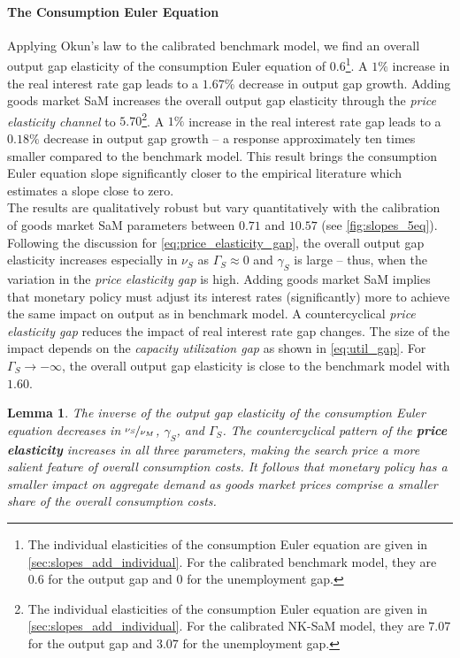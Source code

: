 \documentclass[12pt,3p,authoryear,review]{elsarticle}
\newtheorem{lemma}{Lemma}
\begin{document}
\paragraph{The Consumption Euler Equation}%
Applying Okun's law to the calibrated benchmark model, we find an overall output gap elasticity of the consumption Euler equation of $0.6$\footnote{The individual elasticities of the consumption Euler equation are given in \ref{sec:slopes_add_individual}. For the calibrated benchmark model, they are $0.6$ for the output gap and $0$ for the unemployment gap.}. A $1\%$ increase in the real interest rate gap leads to a $1.67\%$ decrease in output gap growth. Adding goods market SaM increases the overall output gap elasticity through the \emph{price elasticity channel} to $5.70$\footnote{The individual elasticities of the consumption Euler equation are given in \ref{sec:slopes_add_individual}. For the calibrated NK-SaM model, they are $7.07$ for the output gap and $3.07$ for the unemployment gap.}. A $1\%$ increase in the real interest rate gap leads to a $0.18\%$ decrease in output gap growth -- a response approximately ten times smaller compared to the benchmark model. This result brings the consumption Euler equation slope significantly closer to the empirical literature \citep{ascari2021empirical} which estimates a slope close to zero.\\%
The results are qualitatively robust but vary quantitatively with the calibration of goods market SaM parameters between $0.71$ and $10.57$ (see \cref{fig:slopes_5eq}). Following the discussion for \eqref{eq:price_elasticity_gap}, the overall output gap elasticity increases especially in $\nu_S$ as $\Gamma_S \approx 0$ and $\gamma_S$ is large -- thus, when the variation in the \emph{price elasticity gap} is high. Adding goods market SaM implies that monetary policy must adjust its interest rates (significantly) more to achieve the same impact on output as in benchmark model. A countercyclical \emph{price elasticity gap} reduces the impact of real interest rate gap changes. The size of the impact depends on the \emph{capacity utilization gap} as shown in \eqref{eq:util_gap}. For $\Gamma_S \rightarrow - \infty$, the overall output gap elasticity is close to the benchmark model with $1.60$.%
\begin{lemma}%
	The inverse of the output gap elasticity of the consumption Euler equation decreases in $\nicefrac{\nu_S}{\nu_M}$, $\gamma_S$, and $\Gamma_S$. The countercyclical pattern of the \textbf{price elasticity} increases in all three parameters, making the search price a more salient feature of overall consumption costs. It follows that monetary policy has a smaller impact on aggregate demand as goods market prices comprise a smaller share of the overall consumption costs.%
\end{lemma}%
\end{document}
